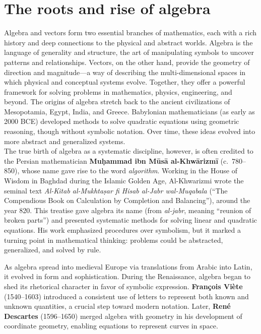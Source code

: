 \documentclass{book}
\begin{document}
\section{The roots and rise of algebra}

Algebra and vectors form two essential branches of mathematics, each with a rich history and deep connections to the physical and abstract worlds. Algebra is the language of generality and structure, the art of manipulating symbols to uncover patterns and relationships. Vectors, on the other hand, provide the geometry of direction and magnitude---a way of describing the multi-dimensional spaces in which physical and conceptual systems evolve. Together, they offer a powerful framework for solving problems in mathematics, physics, engineering, and beyond. The origins of algebra stretch back to the ancient civilizations of Mesopotamia, Egypt, India, and Greece. Babylonian mathematicians (as early as 2000 BCE) developed methods to solve quadratic equations using geometric reasoning, though without symbolic notation. Over time, these ideas evolved into more abstract and generalized systems.\\

The true birth of algebra as a systematic discipline, however, is often credited to the Persian mathematician \textbf{Muḥammad ibn Mūsā al-Khwārizmī} (c.~780--850), whose name gave rise to the word \emph{algorithm}. Working in the House of Wisdom in Baghdad during the Islamic Golden Age, Al-Khwarizmi wrote the seminal text \emph{Al-Kitab al-Mukhtaṣar fi Hisab al-Jabr wal-Muqabala} (``The Compendious Book on Calculation by Completion and Balancing''), around the year 820. This treatise gave algebra its name (from \emph{al-jabr}, meaning ``reunion of broken parts'') and presented systematic methods for solving linear and quadratic equations. His work emphasized procedures over symbolism, but it marked a turning point in mathematical thinking: problems could be abstracted, generalized, and solved by rule.

As algebra spread into medieval Europe via translations from Arabic into Latin, it evolved in form and sophistication. During the Renaissance, algebra began to shed its rhetorical character in favor of symbolic expression. \textbf{François Viète} (1540--1603) introduced a consistent use of letters to represent both known and unknown quantities, a crucial step toward modern notation. Later, \textbf{René Descartes} (1596--1650) merged algebra with geometry in his development of coordinate geometry, enabling equations to represent curves in space.\\
\end{document}
